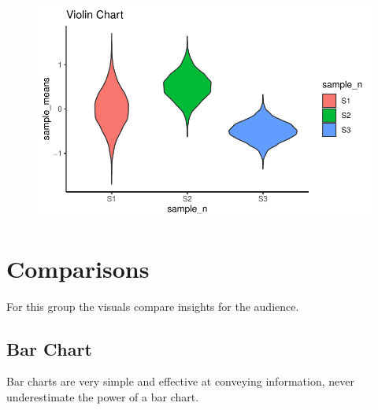 \documentclass[
  letterpaper,
  DIV=11,
  numbers=noendperiod]{scrreprt}
\begin{document}
\begin{figure}[H]

{\centering \includegraphics{./visualizing-data_files/figure-pdf/unnamed-chunk-6-1.pdf}

}

\end{figure}

\hypertarget{comparisons}{%
\section{\texorpdfstring{\textbf{Comparisons}}{Comparisons}}\label{comparisons}}

For this group the visuals compare insights for the audience.

\hypertarget{bar-chart}{%
\subsection{Bar Chart}\label{bar-chart}}

Bar charts are very simple and effective at conveying information, never
underestimate the power of a bar chart.
\end{document}
